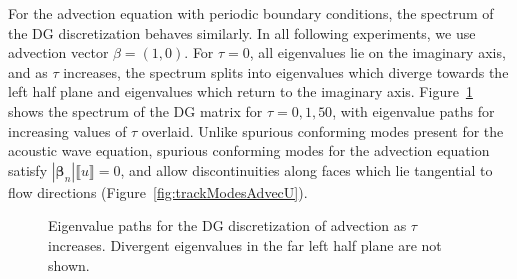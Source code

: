 \documentclass[preprint,10pt]{elsarticle}
\newcommand{\LRb}[1]{\left| #1 \right|}
\newcommand{\jump}[1] {\ensuremath{\llbracket#1\rrbracket}}
\newcommand{\note}[1]{{\color{blue}#1}}
\begin{document}

For the advection equation with periodic boundary conditions, the \note{spectrum} of the DG discretization behaves similarly.  In all following experiments, we use advection vector $\beta = (1,0)$.  For $\tau=0$, all eigenvalues lie on the imaginary axis, and as $\tau$ increases, the \note{spectrum} splits into eigenvalues which diverge towards the left half plane and eigenvalues which return to the imaginary axis.  Figure~\ref{fig:trackModesAdvec} shows the \note{spectrum} of the DG matrix for $\tau = 0,1,50$, with eigenvalue paths for increasing values of $\tau$ overlaid.  Unlike spurious conforming modes present for the acoustic wave equation, spurious conforming modes for the advection equation satisfy $\LRb{\bm{\beta}_n}\jump{ u} = 0$, and allow discontinuities along faces which lie tangential to flow directions (Figure~\ref{fig:trackModesAdvecU}).  


\begin{figure}
\centering
{}
\hspace{.5em}
\caption{Eigenvalue paths for the DG discretization of advection as $\tau$ increases.  Divergent eigenvalues in the far left half plane are not shown.  }
\label{fig:trackModesAdvec}
\end{figure}
\end{document}
